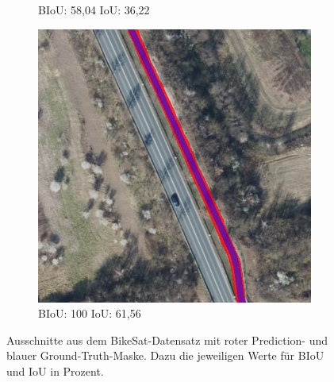\begin{figure}
\begin{subfigure}{.32\textwidth}
		\caption{\ac{BIoU}: 58,04 \ac{IoU}: 36,22}
	\end{subfigure} 
	\begin{subfigure}{.32\textwidth}
		\centering
		\includegraphics[width=1.\linewidth]{Bilder/biou/best-q1-iou6156-idx903.png}
		\caption{\ac{BIoU}: 100 \ac{IoU}: 61,56}
	\end{subfigure}

	\caption{Ausschnitte aus dem BikeSat-Datensatz mit roter Prediction- und blauer Ground-Truth-Maske. 
	Dazu die jeweiligen Werte für \ac{BIoU} und \ac{IoU} in Prozent.}
	\label{fig:biou-showcase}
\end{figure}

